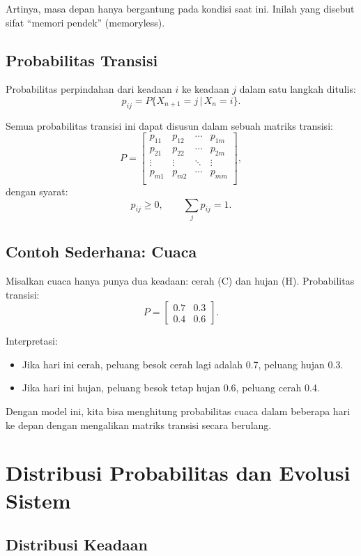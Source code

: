 \documentclass{bukumjh}
\begin{document}
Artinya, masa depan hanya bergantung pada kondisi saat ini. Inilah yang disebut sifat “memori pendek” (memoryless).

\subsection{Probabilitas Transisi}

Probabilitas perpindahan dari keadaan $i$ ke keadaan $j$ dalam satu langkah ditulis:
\[
p_{ij} = P\{X_{n+1}=j \,|\, X_n=i\}.
\]

Semua probabilitas transisi ini dapat disusun dalam sebuah {\jsg matriks transisi}:
\[
P = 
\begin{bmatrix}
p_{11} & p_{12} & \cdots & p_{1m} \\
p_{21} & p_{22} & \cdots & p_{2m} \\
\vdots & \vdots & \ddots & \vdots \\
p_{m1} & p_{m2} & \cdots & p_{mm} \\
\end{bmatrix},
\]
dengan syarat:
\[
p_{ij} \geq 0, \qquad \sum_{j} p_{ij} = 1.
\]

\subsection{Contoh Sederhana: Cuaca}

Misalkan cuaca hanya punya dua keadaan: cerah (C) dan hujan (H). Probabilitas transisi:
\[
P = 
\begin{bmatrix}
0.7 & 0.3 \\
0.4 & 0.6
\end{bmatrix}.
\]

Interpretasi:
\begin{itemize}
    \item Jika hari ini cerah, peluang besok cerah lagi adalah 0.7, peluang hujan 0.3.
    \item Jika hari ini hujan, peluang besok tetap hujan 0.6, peluang cerah 0.4.
\end{itemize}

Dengan model ini, kita bisa menghitung probabilitas cuaca dalam beberapa hari ke depan dengan mengalikan matriks transisi secara berulang.

\section{Distribusi Probabilitas dan Evolusi Sistem}

\subsection{Distribusi Keadaan}
\end{document}
